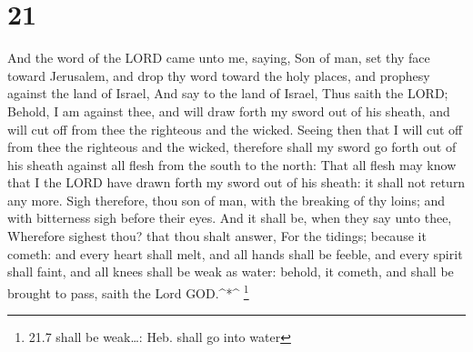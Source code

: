 \hypertarget{section-20}{%
\section{21}\label{section-20}}

 And the word of the LORD came unto me, saying, 
Son of man, set thy face toward Jerusalem, and drop thy word toward the
holy places, and prophesy against the land of Israel,  And
say to the land of Israel, Thus saith the LORD; Behold, I am against
thee, and will draw forth my sword out of his sheath, and will cut off
from thee the righteous and the wicked.  Seeing then that I
will cut off from thee the righteous and the wicked, therefore shall my
sword go forth out of his sheath against all flesh from the south to the
north:  That all flesh may know that I the LORD have drawn
forth my sword out of his sheath: it shall not return any more.
 Sigh therefore, thou son of man, with the breaking of thy
loins; and with bitterness sigh before their eyes.  And it
shall be, when they say unto thee, Wherefore sighest thou? that thou
shalt answer, For the tidings; because it cometh: and every heart shall
melt, and all hands shall be feeble, and every spirit shall faint, and
all knees shall be weak as water: behold, it cometh, and shall be
brought to pass, saith the Lord GOD.\^{}*\^{} \footnote{21.7 shall be
  weak\ldots: Heb. shall go into water}

